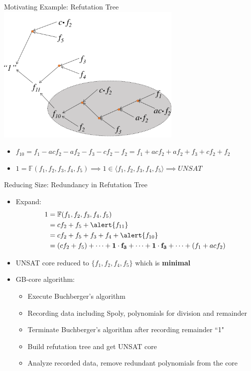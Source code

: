 \documentclass[xcolor=dvipsnames]{beamer}
\newcommand{\bi}{\begin{itemize}}
\newcommand{\ei}{\end{itemize}}
\newcommand{\F}{{\mathbb{F}}}
\begin{document}
\begin{frame}{\large{Motivating Example: Refutation Tree}}
\vspace{-0.1in}
\includegraphics[width=3.5in]{./refutation_1.pdf}
\pause
\bi
\item $f_{10}=f_1-acf_2-af_2-f_3-cf_2-f_2 = f_1+acf_2+af_2+f_3+cf_2+f_2$
\item $1 = \F(f_1,f_2,f_3,f_4,f_5)\implies 1 \in \langle f_1,f_2,f_3,f_4,f_5\rangle \implies UNSAT$
\ei
\end{frame}
\begin{frame}{\large{Reducing Size: Redundancy in Refutation Tree}}
\bi
\item Expand: \begin{align*}
		1 &= \F(f_1,f_2,f_3,f_4,f_5)\\
		&= cf_2+f_5+\alert{f_{11}}\\
		&=cf_2+f_5+f_3+f_4+\alert{f_{10}}\\
		&=(cf_2 + f_5) + \dots + \mathbf{1\cdot f_3} + \dots + \mathbf{1\cdot
  f_3}+ \dots + (f_1 + acf_2)
		\end{align*}
\item UNSAT core reduced to $\{f_1,f_2,f_4,f_5\}$ which is {\bf minimal}
\item \alert{GB-core algorithm}:
	\bi
	\item Execute Buchberger's algorithm
	\item Recording data including Spoly, polynomials for division and remainder
	\item Terminate Buchberger's algorithm after recording remainder ``1"
	\item Build refutation tree and get UNSAT core
	\item Analyze recorded data, remove redundant polynomials from the core
	\ei
\ei
\end{frame}
\end{document}
